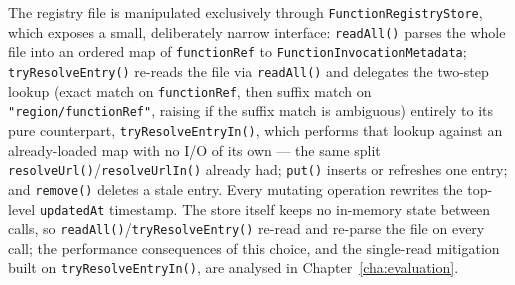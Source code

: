 The registry file is manipulated exclusively through \texttt{FunctionRegistryStore}, which
exposes a small, deliberately narrow interface: \texttt{readAll()} parses the whole file into an
ordered map of \texttt{functionRef} to \texttt{FunctionInvocationMetadata}; \texttt{tryResolveEntry()}
re-reads the file via \texttt{readAll()} and delegates the two-step lookup (exact match on
\texttt{functionRef}, then suffix match on \texttt{"region/functionRef"}, raising if the suffix
match is ambiguous) entirely to its pure counterpart, \texttt{tryResolveEntryIn()}, which performs
that lookup against an already-loaded map with no I/O of its own --- the same split
\texttt{resolveUrl()}/\texttt{resolveUrlIn()} already had; \texttt{put()} inserts or refreshes one entry; and
\texttt{remove()} deletes a stale entry. Every mutating operation rewrites the top-level
\texttt{updatedAt} timestamp. The store itself keeps no in-memory state between calls, so
\texttt{readAll()}/\texttt{tryResolveEntry()} re-read and re-parse the file on every call; the
performance consequences of this choice, and the single-read mitigation built on
\texttt{tryResolveEntryIn()}, are analysed in Chapter~\ref{cha:evaluation}.

